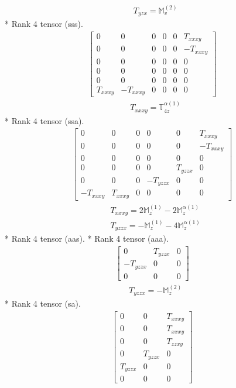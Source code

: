 \documentclass[fleqn,8pt,landscape]{jsarticle}
\begin{document}
\begin{align*}
& T_{yzx} = \mathbb{M}_{v}^{(2)}
\end{align*}
* Rank 4 tensor (sss).
\begin{align*}
\begin{bmatrix} 0 & 0 & 0 & 0 & 0 & T_{xxxy} \\ 0 & 0 & 0 & 0 & 0 & - T_{xxxy} \\ 0 & 0 & 0 & 0 & 0 & 0 \\ 0 & 0 & 0 & 0 & 0 & 0 \\ 0 & 0 & 0 & 0 & 0 & 0 \\ T_{xxxy} & - T_{xxxy} & 0 & 0 & 0 & 0 \end{bmatrix}
\end{align*}
\begin{align*}
& T_{xxxy} = \mathbb{T}_{4z}^{\alpha(1)}
\end{align*}
* Rank 4 tensor (ssa).
\begin{align*}
\begin{bmatrix} 0 & 0 & 0 & 0 & 0 & T_{xxxy} \\ 0 & 0 & 0 & 0 & 0 & - T_{xxxy} \\ 0 & 0 & 0 & 0 & 0 & 0 \\ 0 & 0 & 0 & 0 & T_{yzzx} & 0 \\ 0 & 0 & 0 & - T_{yzzx} & 0 & 0 \\ - T_{xxxy} & T_{xxxy} & 0 & 0 & 0 & 0 \end{bmatrix}
\end{align*}
\begin{align*}
& T_{xxxy} = 2 \mathbb{M}_{z}^{(1)} - 2 \mathbb{M}_{z}^{\alpha(1)} \\
& T_{yzzx} = - \mathbb{M}_{z}^{(1)} - 4 \mathbb{M}_{z}^{\alpha(1)}
\end{align*}
* Rank 4 tensor (aas).
* Rank 4 tensor (aaa).
\begin{align*}
\begin{bmatrix} 0 & T_{yzzx} & 0 \\ - T_{yzzx} & 0 & 0 \\ 0 & 0 & 0 \end{bmatrix}
\end{align*}
\begin{align*}
& T_{yzzx} = - \mathbb{M}_{z}^{(2)}
\end{align*}
* Rank 4 tensor (sa).
\begin{align*}
\begin{bmatrix} 0 & 0 & T_{xxxy} \\ 0 & 0 & T_{xxxy} \\ 0 & 0 & T_{zzxy} \\ 0 & T_{yzzx} & 0 \\ T_{yzzx} & 0 & 0 \\ 0 & 0 & 0 \end{bmatrix}
\end{align*}
\end{document}
